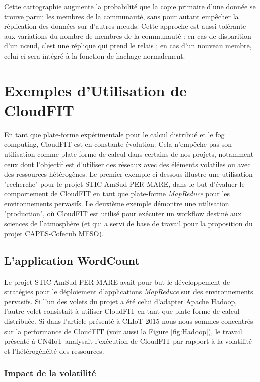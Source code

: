 Cette cartographie augmente la probabilité que la copie primaire d'une donnée se trouve parmi les membres de la communauté, sans pour autant empêcher la réplication des données sur d'autres n{\oe}uds. Cette approche est aussi tolérante aux variations du nombre de membres de la communauté : en cas de disparition d'un n{\oe}ud, c'est une réplique qui prend le relais ; en cas d'un nouveau membre, celui-ci sera intégré à la fonction de hachage normalement.   

\section{Exemples d'Utilisation de CloudFIT}

En tant que plate-forme expérimentale pour le calcul distribué et le fog computing, CloudFIT est en constante évolution. Cela n'empêche pas son utilisation comme plate-forme de calcul dans certains de nos projets, notamment ceux dont l'objectif est d'utiliser des réseaux avec des éléments volatiles ou avec des ressources hétérogènes. Le premier exemple ci-dessous illustre une utilisation "recherche" pour le projet STIC-AmSud PER-MARE, dans le but d'évaluer le comportement de CloudFIT en tant que plate-forme \textit{MapReduce} pour les environnements pervasifs. Le deuxième exemple démontre une utilisation "production", où CloudFIT est utilisé pour exécuter un workflow destiné aux sciences de l'atmosphère (et qui a servi de base de travail pour la proposition du projet CAPES-Cofecub MESO). 


\subsection{L'application WordCount}

Le projet STIC-AmSud PER-MARE avait pour but le développement de stratégies pour le déploiement d'applications \textit{MapReduce} sur des environnements pervasifs. Si l'un des volets du projet a été celui d'adapter Apache Hadoop, l'autre volet consistait à utiliser CloudFIT en tant que plate-forme de calcul distribuée. Si dans l'article présenté à CLIoT 2015 \cite{Steffenel15Taormina} nous nous sommes concentrés sur la performance de CloudFIT (voir aussi la Figure \ref{fig:Hadoop}), le travail présenté à CN4IoT \cite{Steffenel2015Roma} analysait l'exécution de CloudFIT par rapport à la volatilité et l'hétérogénéité des ressources.

\subsubsection{Impact de la volatilité}

